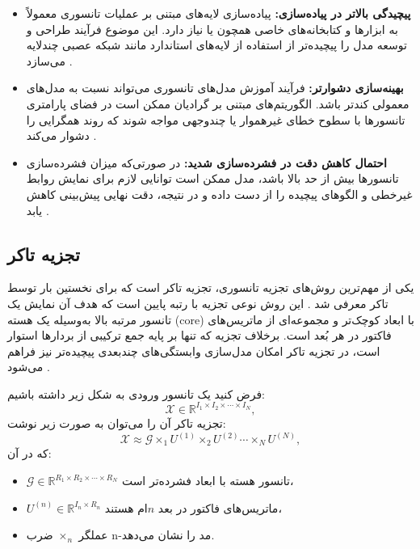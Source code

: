 \begin{itemize}
	\item \textbf{پیچیدگی بالاتر در پیاده‌سازی:} پیاده‌سازی لایه‌های مبتنی بر عملیات تانسوری معمولاً به ابزارها و کتابخانه‌های خاصی همچون  یا  نیاز دارد. این موضوع فرآیند طراحی و توسعه مدل را پیچیده‌تر از استفاده از لایه‌های استاندارد مانند شبکه عصبی چندلایه می‌سازد \cite{kossaifi2017tensorcontraction}.
	
	\item \textbf{بهینه‌سازی دشوارتر:} فرآیند آموزش مدل‌های تانسوری می‌تواند نسبت به مدل‌های معمولی کندتر باشد. الگوریتم‌های مبتنی بر گرادیان ممکن است در فضای پارامتری تانسورها با سطوح خطای غیرهموار یا چندوجهی مواجه شوند که روند همگرایی را دشوار می‌کند \cite{yang2017ttrnn}.
	
	\item \textbf{احتمال کاهش دقت در فشرده‌سازی شدید:} در صورتی‌که میزان فشرده‌سازی تانسورها بیش از حد بالا باشد، مدل ممکن است توانایی لازم برای نمایش روابط غیرخطی و الگوهای پیچیده را از دست داده و در نتیجه، دقت نهایی پیش‌بینی کاهش یابد \cite{kossaifi2020tensorregression}.
\end{itemize}

\subsection{تجزیه تاکر}

یکی از مهم‌ترین روش‌های تجزیه تانسوری، تجزیه تاکر است که برای نخستین بار توسط تاکر معرفی شد \cite{tucker1966some}.
این روش نوعی تجزیه با رتبه پایین است که هدف آن نمایش یک تانسور مرتبه بالا به‌وسیله یک هسته (core) با ابعاد کوچک‌تر و مجموعه‌ای از ماتریس‌های فاکتور در هر بُعد است.
برخلاف تجزیه  که تنها بر پایه جمع ترکیبی از بردارها استوار است، در تجزیه تاکر امکان مدل‌سازی وابستگی‌های چندبعدی پیچیده‌تر نیز فراهم می‌شود \cite{kolda2009tensor}.

فرض کنید یک تانسور ورودی به شکل زیر داشته باشیم:
\[
\mathcal{X} \in \mathbb{R}^{I_1 \times I_2 \times \cdots \times I_N},
\]
تجزیه تاکر آن را می‌توان به صورت زیر نوشت:
\[
\mathcal{X} \approx \mathcal{G} \times_1 U^{(1)} \times_2 U^{(2)} \cdots \times_N U^{(N)},
\]
که در آن:
\begin{itemize}
	\item $\mathcal{G} \in \mathbb{R}^{R_1 \times R_2 \times \cdots \times R_N}$ تانسور هسته با ابعاد فشرده‌تر است،
	\item $U^{(n)} \in \mathbb{R}^{I_n \times R_n}$ ماتریس‌های فاکتور در بعد $n$ام هستند،
	\item عملگر $\times_n$ ضرب n-مد را نشان می‌دهد.
\end{itemize}

